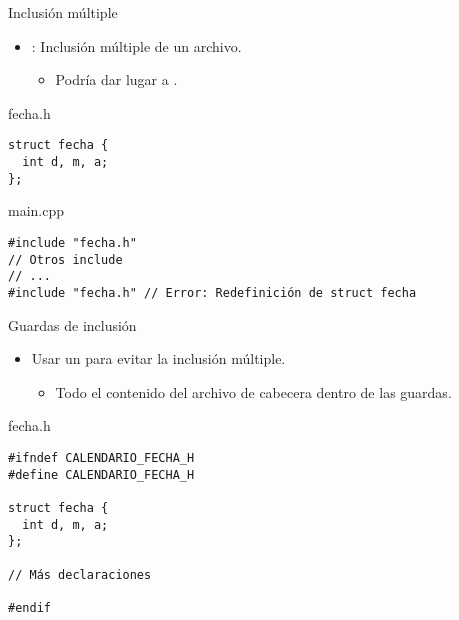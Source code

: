 \begin{frame}[t,fragile]{Inclusión múltiple}
\begin{itemize}
  \item {}: Inclusión múltiple de un archivo.
    \begin{itemize}
      \item Podría dar lugar a .
    \end{itemize}
\end{itemize}

\begin{block}{fecha.h}
\begin{lstlisting}
struct fecha {
  int d, m, a;
};
\end{lstlisting}
\end{block}
\begin{block}{main.cpp}
\begin{lstlisting}
#include "fecha.h"
// Otros include
// ...
#include "fecha.h" // Error: Redefinición de struct fecha
\end{lstlisting}
\end{block}
\end{frame}

\begin{frame}[t,fragile]{Guardas de inclusión}
\begin{itemize}
  \item Usar un  para evitar la 
        inclusión múltiple.
    \begin{itemize}
      \item Todo el contenido del archivo de cabecera dentro de las guardas.
    \end{itemize}
\end{itemize}

\begin{block}{fecha.h}
\begin{lstlisting}
#ifndef CALENDARIO_FECHA_H
#define CALENDARIO_FECHA_H

struct fecha {
  int d, m, a;
};

// Más declaraciones

#endif
\end{lstlisting}
\end{block}
\end{frame}

